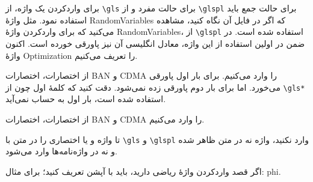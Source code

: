 \documentclass{report}
\begin{document}
برای واردکردن یک واژه، از
\verb+\gls+
برای حالت مفرد و از
\verb+\glspl+
برای حالت جمع باید استفاده نمود. مثل واژهٔ
\glspl{RandomVariable}
که اگر در فایل
\lr{\TeX}
آن نگاه کنید، مشاهده می‌کنید که برای واردکردن واژهٔ
\glspl{RandomVariable}،
از
\verb+\glspl+
استفاده شده است. در ضمن در اولین استفاده از این واژه، معادل انگلیسی آن نیز پاورقی خورده است. اکنون واژهٔ
\gls{Optimization}
را تعریف می‌کنیم. 

از اختصارات، اختصارات
\gls*{BAN} و \gls{CDMA}
را وارد می‌کنیم. برای بار اول پاورقی می‌خورد. اما برای بار دوم پاورقی زده نمی‌شود. دقت کنید که کلمهٔ اول چون از
\verb+\gls*+
استفاده شده است، بار اول به حساب نمی‌آید. 

از اختصارات، اختصارات
\gls{BAN} و \gls{CDMA}
را وارد می‌کنیم. 

تا واژه و یا اختصاری را در متن با
\verb+\gls+ و \verb+\glspl+
وارد نکنید، واژه نه در متن ظاهر شده و نه در واژه‌نامه‌ها وارد می‌شود.

اگر قصد واردکردن واژه‌ٔ ریاضی دارید، باید با آپشن
\LR{\verb+[sort=fullName]+}
تعریف کنید؛ برای مثال:
\gls{phi}.

\printglossary
\printabbreviation
\end{document}
